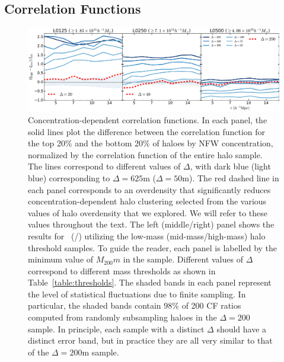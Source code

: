 \documentclass[usenatbib,fleqn]{mnras}
\begin{document}
\subsection{Correlation Functions}
\label{sub:cfresults}


\begin{figure}
	\centering
	\includegraphics[width=\textwidth]{all_cfcompare_cnfw.pdf}
	\caption{
Concentration-dependent correlation functions. In each panel, the solid lines plot the difference between the correlation function for the top 20\% and the bottom 20\% of haloes by NFW concentration, normalized by the correlation function of the entire halo sample. The lines correspond to different values of $\Delta$, with dark blue (light blue) corresponding to $\Delta = 625$m ($\Delta = 50$m). The red dashed line in each panel  corresponds to an overdensity that significantly reduces concentration-dependent halo clustering selected from the various values of halo overdensity that we explored. We will refer to these values throughout the text. The left (middle/right) panel shows the results for \simA \ (\simB /\simC) utilizing the low-mass (mid-mass/high-mass) halo threshold samples. To guide the reader, each panel is labelled by the minimum value of $M_{200}m$ in the sample. Different values of $\Delta$ correspond to different mass thresholds as shown in Table~\ref{table:thresholds}. The shaded bands in each panel represent the level of statistical fluctuations due to finite sampling. In particular, the shaded bands contain $98\%$ of 200 CF ratios computed from randomly subsampling haloes in the $\Delta=200$ sample. In principle, each sample with a distinct $\Delta$ should have a distinct error band, but in practice they are all very similar to that of the $\Delta=200$m sample. 
}
\label{fig:cc_cfcompare}
\end{figure}
\end{document}
